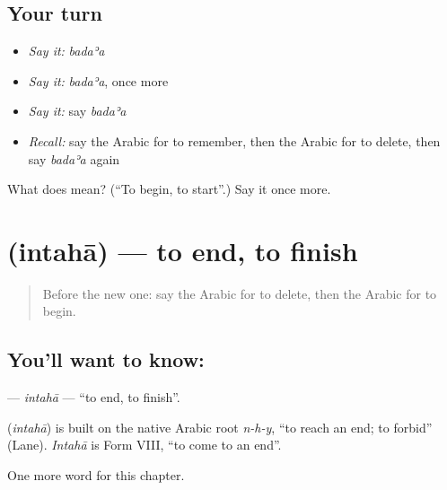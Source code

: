 \subsection*{Your turn}
\begin{itemize}
\raggedright
  \item \emph{Say it:} \emph{badaʾa}
  \item \emph{Say it:} \emph{badaʾa}, once more
  \item \emph{Say it:} say \emph{badaʾa}
  \item \emph{Recall:} say the Arabic for to remember, then the Arabic for to delete, then say \emph{badaʾa} again
\end{itemize}

\begin{tcolorbox}[breakable,colback=teal!4,colframe=teal!35!black,title={Before you move on}]
What does  mean? (\textquotedblleft{}To begin, to start\textquotedblright{}.) Say it once more.
\end{tcolorbox}
\section[\texorpdfstring{\ar{انتهى} (intahā)}{انتهى (intahā)}]{ (intahā) — to end, to finish}

\label{lesson:AR-C165-intaha}



\begin{quote}
Before the new one: say the Arabic for to delete, then the Arabic for to begin.
\end{quote}

\subsection*{You'll want to know: }
\textbf{} — \emph{intahā} — \textquotedblleft{}to end, to finish\textquotedblright{}.

\begin{cousinweb}
\textbf{} (\emph{intahā}) is built on the native Arabic root \emph{n-h-y}, \textquotedblleft{}to reach an end; to forbid\textquotedblright{} (Lane). \emph{Intahā} is Form VIII, \textquotedblleft{}to come to an end\textquotedblright{}.
\end{cousinweb}

\begin{grammarlens}[title={What you've built}]
One more word for this chapter.
\end{grammarlens}

